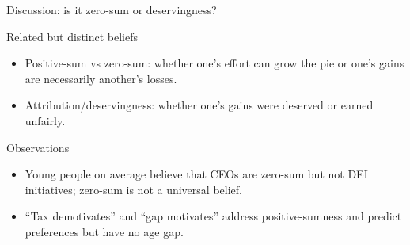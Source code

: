 \documentclass[aspectratio=169]{beamer}
\begin{document}
\begin{frame}{Discussion: is it zero-sum or deservingness?}

Related but distinct beliefs
\begin{itemize}
    \item Positive-sum vs zero-sum: whether one's effort can grow the pie or one's gains are necessarily another's losses. 
    \item Attribution/deservingness: whether one's gains were deserved or earned unfairly. %
\end{itemize}
Observations
\begin{itemize}
    \item Young people on average believe that CEOs are zero-sum but not DEI initiatives; zero-sum is not a universal belief.
    \item ``Tax demotivates'' and ``gap motivates'' address positive-sumness and predict preferences but have no age gap. 
\end{itemize}
    
\end{frame}






%
%
\end{document}
